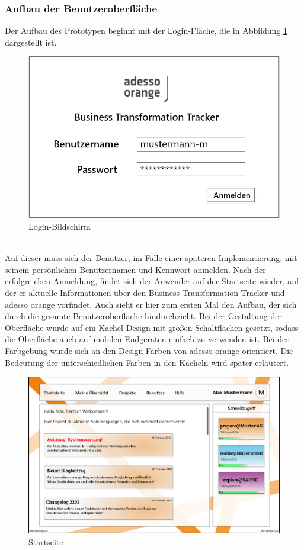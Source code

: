 \subsubsection{Aufbau der Benutzeroberfläche}
Der Aufbau des Prototypen beginnt mit der Login-Fläche, die in Abbildung \ref{fig:Login} dargestellt ist. 
\begin{figure}[h!]
    \centering
    \includegraphics[scale=0.35]{./Prototyp/01_Login.png}
    \caption[Prototyp: Login-Bildschirm]{Login-Bildschirm}
    \label{fig:Login}
\end{figure}
\\Auf dieser muss sich der Benutzer, im Falle einer späteren Implementierung, mit seinem persönlichen Benutzernamen und Kennwort anmelden. Nach der erfolgreichen Anmeldung, findet sich der Anwender auf der Startseite wieder, auf der er aktuelle Informationen über den Business Transformation Tracker und adesso orange vorfindet.
Auch sieht er hier zum ersten Mal den Aufbau, der sich durch die gesamte Benutzeroberfläche hindurchzieht. Bei der Gestaltung der Oberfläche wurde auf ein \glqq{}Kachel-Design\grqq{} mit großen Schaltflächen gesetzt, sodass die Oberfläche auch auf mobilen Endgeräten einfach zu verwenden ist. Bei der Farbgebung wurde sich an den Design-Farben von adesso orange orientiert. Die Bedeutung der unterschiedlichen Farben in den Kacheln wird später erläutert. 
\begin{figure}[h!]
    \centering
    \includegraphics[scale=0.35]{./Prototyp/02_Startseite.png}
    \caption[Prototyp: Startseite]{Startseite}
    \label{fig:Startseite}
\end{figure}
